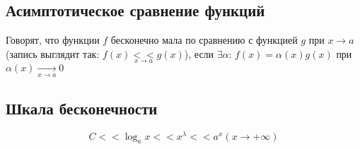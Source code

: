 \documentclass[class=article,a4paper,12pt,crop=false]{standalone}
\begin{document}
\subsection{Асимптотическое сравнение функций}

Говорят, что функции $f$ бесконечно мала по сравнению с функцией $g$ при $x \rightarrow a$ 
(запись выглядит так:  $f(x) \underset{x \rightarrow a}{<<} g(x)$), если $\exists \alpha$:
$f(x) = \alpha(x)g(x)$ при $\alpha(x) \underset{x \rightarrow a}{\longrightarrow} 0$

\subsection{Шкала бесконечности}

\begin{equation}
    C << \log_a{x} << x^{\lambda} << a^x (x \rightarrow +\infty)
\end{equation}
\end{document}
